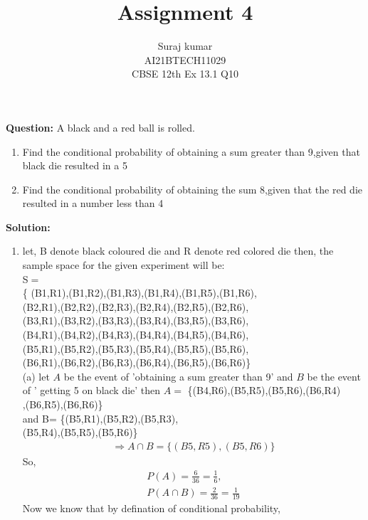 \documentclass[10pt,twocolumn]{IEEEtran}
\title{Assignment 4}
\author{Suraj kumar \\ \normalsize AI21BTECH11029\\ \Large CBSE 12th Ex 13.1 Q10 }
\newcommand{\question}{\noindent \textbf{Question: }}
\newcommand{\solution}{\noindent \textbf{Solution: }}
\begin{document}
\maketitle
\question A black and a red ball is rolled.
\begin{enumerate}[label=(\roman*)]
    \item Find the conditional probability of obtaining a sum greater than 9,given that black die resulted in a 5
    \item Find the conditional probability of obtaining the sum 8,given that the red die resulted in a number less than 4
\end{enumerate}
\solution
\begin{enumerate}[label=(\roman*)]
    \item  let, B denote black coloured die and R denote red colored die
          then, the sample space for the given experiment will be:\\
          S$=$ \\
          \{ (B1,R1),(B1,R2),(B1,R3),(B1,R4),(B1,R5),(B1,R6), \\
          (B2,R1),(B2,R2),(B2,R3),(B2,R4),(B2,R5),(B2,R6), \\
          (B3,R1),(B3,R2),(B3,R3),(B3,R4),(B3,R5),(B3,R6), \\
          (B4,R1),(B4,R2),(B4,R3),(B4,R4),(B4,R5),(B4,R6), \\
          (B5,R1),(B5,R2),(B5,R3),(B5,R4),(B5,R5),(B5,R6), \\
          (B6,R1),(B6,R2),(B6,R3),(B6,R4),(B6,R5),(B6,R6)\}\\
          (a) let $A$ be the event of 'obtaining a sum greater than 9' and $B$ be the event of ' getting 5 on black die'
          then $A=$
          \{(B4,R6),(B5,R5),(B5,R6),(B6,R4) \\
          ,(B6,R5),(B6,R6)\} \\
          and B=
          \{(B5,R1),(B5,R2),(B5,R3),        \\
          (B5,R4),(B5,R5),(B5,R6)\}
          \begin{align*}
              \Rightarrow  A \cap B = \{ (B5,R5),(B5,R6)\}
          \end{align*}
          So,
          \begin{align}
              P(A)=\frac{6}{36}=\frac{1}{6},\\
               P(A\cap B)=\frac{2}{36}=\frac{1}{19}
          \end{align}
          Now we know that by defination of conditional probability,

\end{enumerate}
\end{document}
